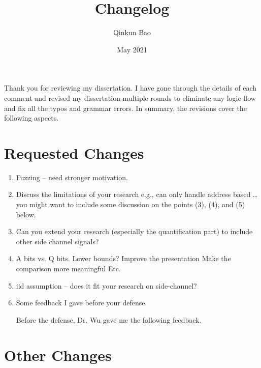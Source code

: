 \documentclass{article}
\title{Changelog}
\author{Qinkun Bao}
\date{May 2021}
\begin{document}
\maketitle
Thank you for reviewing my dissertation. I have gone through the details of each comment and revised my dissertation multiple rounds to eliminate any logic flow and fix all the typos and grammar errors. In summary, the revisions cover the following aspects.

\section{Requested Changes}

\begin{enumerate}
\item Fuzzing – need stronger motivation.
\item Discuss the limitations of your research
e.g., can only handle address based …
you might want to include some discussion on the points (3), (4), and (5) below.
\item Can you extend your research (especially the quantification part) to include other side channel signals?
\item A bits vs. Q bits. Lower bounds?
       Improve the presentation
       Make the comparison more meaningful
       Etc.
\item iid assumption – does it fit your research on side-channel?
\item Some feedback I gave before your defense.

Before the defense, Dr. Wu gave me the following feedback.
\end{enumerate}
\section{Other Changes}
\end{document}
